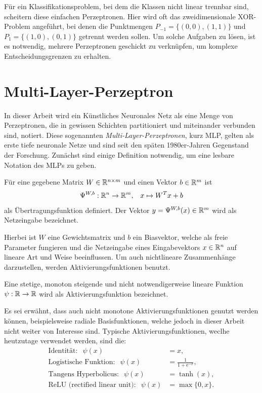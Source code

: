 Für ein Klassifikationsproblem, bei dem die Klassen nicht linear trennbar sind, scheitern diese einfachen Perzeptronen. Hier wird oft das zweidimensionale XOR-Problem angeführt, bei denen die Punktmengen $P_{-1}=\{(0,0),(1,1)\}$ und $P_{1}=\{(1,0),(0,1)\}$ getrennt werden sollen. Um solche Aufgaben zu lösen, ist es notwendig, mehrere Perzeptronen geschickt zu verknüpfen, um komplexe Entscheidungsgrenzen zu erhalten.

\section{Multi-Layer-Perzeptron}
\label{MLP_abs}
In dieser Arbeit wird ein Künstliches Neuronales Netz als eine Menge von Perzeptronen, die in gewissen Schichten partitioniert und miteinander verbunden sind, notiert. Diese sogenannten \textit{Multi-Layer-Perzeptronen}, kurz MLP,  gelten als erste tiefe neuronale Netze und sind seit den späten 1980er-Jahren Gegenstand der Forschung\cite{bourlard1990links,bounds1988multilayer,MLPbook}. Zunächst sind einige Definition notwendig, um eine lesbare Notation des MLPs zu geben.

\begin{defi}[Übertragungsfunktion]
    \label{def_net}
    Für eine gegebene Matrix $W \in \mathbb{R}^{n \times m}$ und einen Vektor $b \in \mathbb{R}^m$ ist 
    \[ 
    \Psi^{W,b}: \mathbb{R}^n \rightarrow \mathbb{R}^m, \; \; \; x \mapsto W^T x +b
    \]
    als Übertragungsfunktion definiert. Der Vektor $y=\Psi^{W,b}(x) \in \mathbb{R}^m $ wird als Netzeingabe bezeichnet.
\end{defi}
Hierbei ist $W$ eine Gewichtsmatrix und $b$ ein Biasvektor, welche als freie Parameter fungieren und die Netzeingabe eines Eingabevektors $x \in \mathbb{R}^n$ auf lineare Art und Weise beeinflussen. Um auch nichtlineare Zusammenhänge darzustellen, werden Aktivierungsfunktionen benutzt.

\begin{defi}[Aktivierungsfunktion]
    \label{def_act_f}
    Eine stetige, monoton steigende und nicht notwendigerweise lineare Funktion $\psi: \mathbb{R} \rightarrow \mathbb{R}$ wird als Aktivierungsfunktion bezeichnet.
\end{defi}
Es sei erwähnt, dass auch nicht monotone Aktivierungsfunktionen genutzt werden können, beispielsweise radiale Basisfunktionen\cite{radialbasis}, welche jedoch in dieser Arbeit nicht weiter von Interesse sind.
Typische Aktivierungsfunktionen, weclhe heutzutage verwendet werden, sind die:
\begin{align*}
    \text{Identität}: \; \;\psi(x)&=x, \\
    \text{Logistische Funktion}: \; \;\psi(x)&=\frac{1}{1+\mathrm{e}^{-x}}, \\
    \text{Tangens Hyperbolicus}: \; \;\psi(x)&=\tanh(x), \\
    \text{ReLU (rectified linear unit)}: \; \;\psi(x)&=\max\{0,x\}.
\end{align*}

